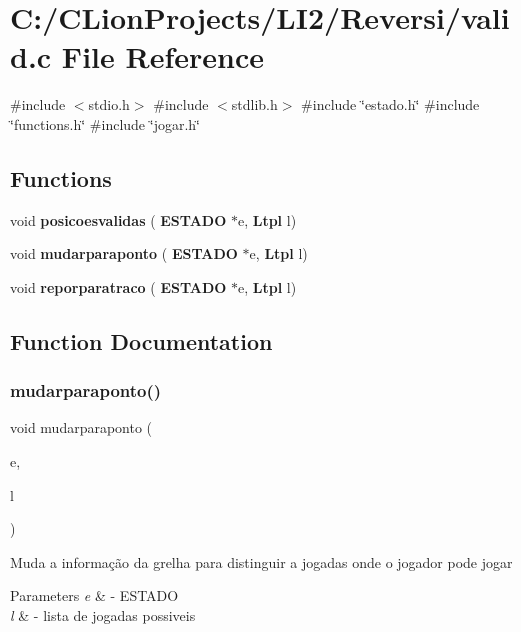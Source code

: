 \section{C\+:/\+C\+Lion\+Projects/\+L\+I2/\+Reversi/valid.c File Reference}
\label{valid_8c}
{\ttfamily \#include $<$stdio.\+h$>$}\newline
{\ttfamily \#include $<$stdlib.\+h$>$}\newline
{\ttfamily \#include \char`\"{}estado.\+h\char`\"{}}\newline
{\ttfamily \#include \char`\"{}functions.\+h\char`\"{}}\newline
{\ttfamily \#include \char`\"{}jogar.\+h\char`\"{}}\newline
\subsection*{Functions}
\begin{DoxyCompactItemize}
\item 
void \textbf{ posicoesvalidas} (\textbf{ E\+S\+T\+A\+DO} $\ast$e, \textbf{ Ltpl} l)
\item 
void \textbf{ mudarparaponto} (\textbf{ E\+S\+T\+A\+DO} $\ast$e, \textbf{ Ltpl} l)
\item 
void \textbf{ reporparatraco} (\textbf{ E\+S\+T\+A\+DO} $\ast$e, \textbf{ Ltpl} l)
\end{DoxyCompactItemize}


\subsection{Function Documentation}
\mbox{\label{valid_8c_a3847018dddb5d8bdedd3c7af8e69093e}} 
\subsubsection{mudarparaponto()}
{\footnotesize\ttfamily void mudarparaponto (\begin{DoxyParamCaption}\item[{\textbf{ E\+S\+T\+A\+DO} $\ast$}]{e,  }\item[{\textbf{ Ltpl}}]{l }\end{DoxyParamCaption})}

Muda a informação da grelha para distinguir a jogadas onde o jogador pode jogar 
\begin{DoxyParams}{Parameters}
{\em e} & -\/ E\+S\+T\+A\+DO \\
\hline
{\em l} & -\/ lista de jogadas possiveis \\
\hline
\end{DoxyParams}
\mbox{\label{valid_8c_a3327163c7124dd1a39f10c2be0ad9232}} 

